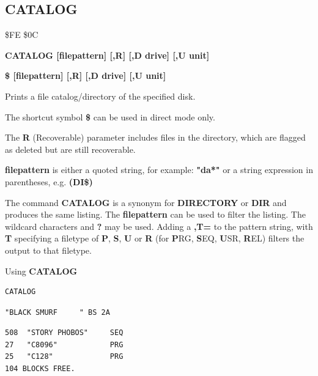 \subsection{CATALOG}
\begin{description}[leftmargin=2cm,style=nextline]
\item [Token:]  \$FE \$0C
\item [Format:] {\bf CATALOG [filepattern] [,R] [,D drive] [,U unit] }
\item [Format:] {\bf \$ [filepattern] [,R] [,D drive] [,U unit] }
\item [Usage:]  Prints a file catalog/directory of the specified disk.

   The shortcut symbol {\bf \$} can be used in direct mode only.

   The {\bf R} (Recoverable) parameter includes files in the
   directory, which are flagged as deleted but are still
   recoverable.

   {\bf filepattern} is either a quoted string, for example: {\bf "da*"} or
   a string expression in parentheses, e.g. {\bf (DI\$)}

   \drivedefinition

   \unitdefinition

\item [Remarks:]
   The command {\bf CATALOG} is a synonym for {\bf DIRECTORY}
   or {\bf DIR} and produces the same listing.
   The {\bf filepattern} can be used to filter the listing.
   The wildcard characters {\bf *} and {\bf ?} may be used.
   Adding a {\bf ,T=} to the pattern string, with {\bf T} specifying
   a filetype of {\bf P}, {\bf S}, {\bf U} or {\bf R}
   (for {\bf P}RG, {\bf S}EQ, {\bf U}SR, {\bf R}EL) filters the
   output to that filetype.

\item [Example:] Using {\bf CATALOG}

\begin{tcolorbox}[colback=black,coltext=white]
\verbatimfont{\codefont}
\begin{verbatim}
CATALOG
\end{verbatim}
\selectfont{\codefont 0}
\begin{tcolorbox}[colback=white,coltext=black,arc=0mm,boxrule=0mm,
       left*=0.5mm,right*=0mm,top=0mm,bottom=0mm,nobeforeafter,
       left skip=0.5mm,
       width=28mm,height=3mm,valign=center]
\begin{verbatim}
"BLACK SMURF     " BS 2A
\end{verbatim}
\end{tcolorbox}
\begin{verbatim}
508  "STORY PHOBOS"     SEQ
27   "C8096"            PRG
25   "C128"             PRG
104 BLOCKS FREE.
\end{verbatim}
\end{tcolorbox}


\end{description}
